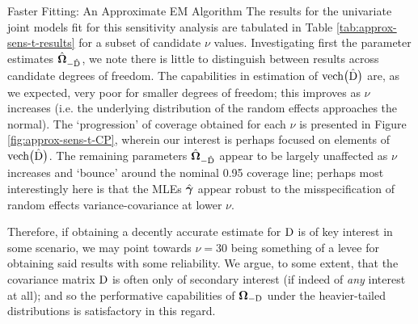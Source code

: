 \begin{chapter}{\label{cha:approx}Faster Fitting: An Approximate EM Algorithm}
  The results for the univariate joint models fit for this sensitivity analysis are tabulated in Table \ref{tab:approx-sens-t-results} for a subset of candidate $\nu$ values. Investigating first the parameter estimates $\hat{\bm{\Omega}}_{-\hat{\mathrm{D}}}$, we note there is little to distinguish between results across candidate degrees of freedom. The capabilities in estimation of $\text{vech}\big(\hat{\mathrm{D}}\big)$ are, as we expected, very poor for smaller degrees of freedom; this improves as $\nu$ increases (i.e. the underlying distribution of the random effects approaches the normal). The `progression' of coverage obtained for each $\nu$ is presented in Figure \ref{fig:approx-sens-t-CP}, wherein our interest is perhaps focused on elements of $\text{vech}\big(\hat{\mathrm{D}}\big)$. The remaining parameters $\hat{\bm{\Omega}}_{-\hat{\mathrm{D}}}$ appear to be largely unaffected as $\nu$ increases and `bounce' around the nominal 0.95 coverage line; perhaps most interestingly here is that the MLEs $\hat{\bm{\gamma}}$ appear robust to the misspecification of random effects variance-covariance at lower $\nu$. 
  
  Therefore, if obtaining a decently accurate estimate for $\mathrm{D}$ is of key interest in some scenario, we may point towards $\nu=30$ being something of a levee for obtaining said results with some reliability. We argue, to some extent, that the covariance matrix $\mathrm{D}$ is often only of secondary interest (if indeed of \textit{any} interest at all); and so the performative capabilities of $\bm{\mathrm{\Omega}}_{-\mathrm{D}}$ under the heavier-tailed distributions is satisfactory in this regard.


\end{chapter}
